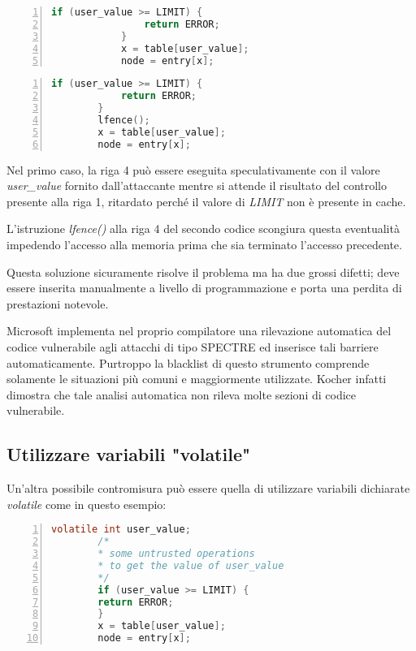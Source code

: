 		\begin{lstlisting}[language={C},frame={blrt},basicstyle=\footnotesize,numbers=left,numberstyle=\scriptsize\color{black}]
			if (user_value >= LIMIT) {
				return ERROR;
			} 
			x = table[user_value]; 
			node = entry[x];
		\end{lstlisting}
		
		\begin{lstlisting}[language={C},frame={rlbt},basicstyle=\footnotesize,numbers=left,numberstyle=\scriptsize\color{black}]
		if (user_value >= LIMIT) {
			return ERROR;
		} 
		lfence(); 
		x = table[user_value]; 
		node = entry[x];
		\end{lstlisting}
		
		Nel primo caso, la riga 4 può essere eseguita speculativamente con il valore \emph{user\_value} fornito dall'attaccante mentre si attende il risultato del controllo presente alla riga 1, ritardato perché il valore di \emph{LIMIT} non è presente in cache.
		
		L'istruzione \emph{lfence()} alla riga 4 del secondo codice scongiura questa eventualità impedendo l'accesso alla memoria prima che sia terminato l'accesso precedente. 
		
		Questa soluzione sicuramente risolve il problema ma ha due grossi difetti; deve essere inserita manualmente a livello di programmazione e porta una perdita di prestazioni notevole\cite{AMD2018speculation}.
		
		Microsoft implementa nel proprio compilatore una rilevazione automatica del codice vulnerabile agli attacchi di tipo SPECTRE ed inserisce tali barriere automaticamente. Purtroppo la blacklist di questo strumento comprende solamente le situazioni più comuni e maggiormente utilizzate. Kocher infatti dimostra che tale analisi automatica non rileva molte sezioni di codice vulnerabile\cite{kocher2018mitigation}.
		
		\subsection{Utilizzare variabili "volatile"}
		
		Un'altra possibile contromisura può essere quella di utilizzare variabili dichiarate \emph{volatile} come in questo esempio:
		
		\begin{lstlisting}[language={C},frame={rlbt},basicstyle=\footnotesize,numbers=left,numberstyle=\scriptsize\color{black}]
		volatile int user_value;
		/*
		* some untrusted operations 
		* to get the value of user_value
		*/
		if (user_value >= LIMIT) {
		return ERROR;
		} 
		x = table[user_value]; 
		node = entry[x];
		\end{lstlisting}
		
